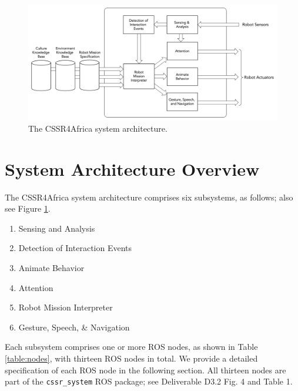 \documentclass{CSSRforAfrica}
\begin{document}
\begin{figure}[tbh]
\begin{center}
\includegraphics[width=160mm,angle=0]{System_Architecture.png}
\end{center}
\vspace{-5mm}
\caption{The CSSR4Africa system architecture.}  
\label{fig:architecture1}       
\end{figure}


\section{System Architecture Overview}

The CSSR4Africa system architecture comprises six subsystems, as follows; also see Figure \ref{fig:architecture1}.
\begin{enumerate}
\item Sensing and Analysis
\vspace{-2mm}
\item Detection of Interaction Events
\vspace{-2mm}
\item Animate Behavior
\vspace{-2mm}
\item Attention
\vspace{-2mm}
\item Robot Mission Interpreter
\vspace{-2mm}
\item Gesture, Speech, \& Navigation
\end{enumerate}
Each subsystem comprises one or more ROS nodes, as shown in Table \ref{table:nodes}, with thirteen ROS nodes in total.
We provide a detailed specification of each ROS node in the following section.
All thirteen nodes are part of the  {\small \verb+cssr_system+}   ROS package; see Deliverable D3.2 Fig. 4 and Table 1.
\end{document}

